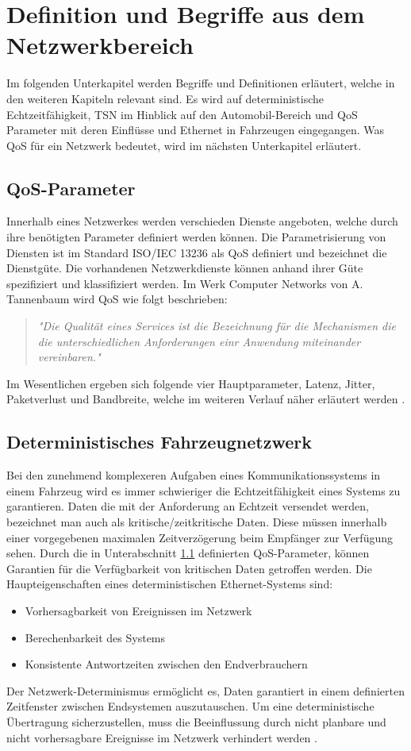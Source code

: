 \section{Definition und Begriffe aus dem Netzwerkbereich}
Im folgenden Unterkapitel werden Begriffe und Definitionen erläutert, welche in den weiteren Kapiteln relevant sind. Es wird auf deterministische Echtzeitfähigkeit, \ac{TSN} im Hinblick auf den Automobil-Bereich und \acf{QoS} Parameter mit deren Einflüsse und Ethernet in Fahrzeugen eingegangen. Was \ac{QoS} für ein Netzwerk bedeutet, wird im nächsten Unterkapitel erläutert.

\subsection{\ac{QoS}-Parameter}\label{sec:QoSParam}
Innerhalb eines Netzwerkes werden verschieden Dienste angeboten, welche durch ihre benötigten Parameter definiert werden können. Die Parametrisierung von Diensten ist im Standard ISO/IEC 13236 als \acf{QoS} definiert und bezeichnet die Dienstgüte. Die vorhandenen Netzwerkdienste können anhand ihrer Güte spezifiziert und klassifiziert werden. Im Werk Computer Networks von A. Tannenbaum wird \acs{QoS} wie folgt beschrieben:
\begin{quote}
	\emph{"Die Qualität eines Services ist die Bezeichnung für die Mechanismen die die unterschiedlichen Anforderungen einr Anwendung miteinander vereinbaren."}
\end{quote}
Im Wesentlichen ergeben sich folgende vier Hauptparameter, Latenz, Jitter, Paketverlust und Bandbreite, welche im weiteren Verlauf näher erläutert werden \cite{Network}.

\subsection{Deterministisches Fahrzeugnetzwerk}
Bei den zunehmend komplexeren Aufgaben eines Kommunikationssystems in einem Fahrzeug wird es immer schwieriger die Echtzeitfähigkeit eines Systems zu garantieren. Daten die mit der Anforderung an Echtzeit versendet werden, bezeichnet man auch als kritische/zeitkritische Daten. Diese müssen innerhalb einer vorgegebenen maximalen Zeitverzögerung beim Empfänger zur Verfügung sehen. Durch die in Unterabschnitt \ref{sec:QoSParam} definierten \acs{QoS}-Parameter, können Garantien für die Verfügbarkeit von kritischen Daten getroffen werden.
Die Haupteigenschaften eines deterministischen Ethernet-Systems sind:
\begin{itemize}
	\item Vorhersagbarkeit von Ereignissen im Netzwerk
	\item Berechenbarkeit des Systems
	\item Konsistente Antwortzeiten zwischen den Endverbrauchern
\end{itemize}
Der Netzwerk-Determinismus ermöglicht es, Daten garantiert in einem definierten Zeitfenster zwischen Endsystemen auszutauschen. Um eine deterministische Übertragung sicherzustellen, muss die Beeinflussung durch nicht planbare und nicht vorhersagbare Ereignisse im Netzwerk verhindert werden \cite{determinismus}.


